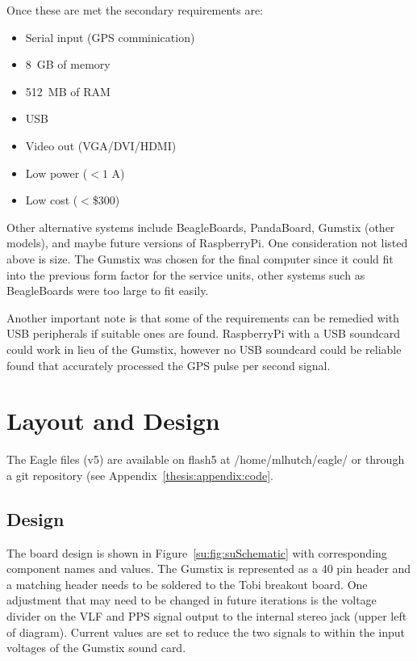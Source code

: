 Once these are met the secondary requirements are:

\begin{itemize}
\item{Serial input (GPS comminication)}
\item{8~GB of memory}
\item{512~MB of RAM}
\item{USB}
\item{Video out (VGA/DVI/HDMI)}
\item{Low power ($<1$ A)}
\item{Low cost ($<$\$300)}
\end{itemize}

Other alternative systems include BeagleBoards, PandaBoard, Gumstix (other models), and maybe future versions of RaspberryPi.
One consideration not listed above is size.
The Gumstix was chosen for the final computer since it could fit into the previous form factor for the service units, other systems such as BeagleBoards were too large to fit easily.

Another important note is that some of the requirements can be remedied with USB peripherals if suitable ones are found.
RaspberryPi with a USB soundcard could work in lieu of the Gumstix, however no USB soundcard could be reliable found that accurately processed the GPS pulse per second signal.

\section{Layout and Design}

The Eagle files (v5) are available on flash5 at /home/mlhutch/eagle/ or through a git repository (see Appendix~\ref{thesis:appendix:code}. 

\subsection{Design}

The board design is shown in Figure~\ref{su:fig:suSchematic} with corresponding component names and values.
The Gumstix is represented as a 40 pin header and a matching header needs to be soldered to the Tobi breakout board.
One adjustment that may need to be changed in future iterations is the voltage divider on the VLF and PPS signal output to the internal stereo jack (upper left of diagram).
Current values are set to reduce the two signals to within the input voltages of the Gumstix sound card.

